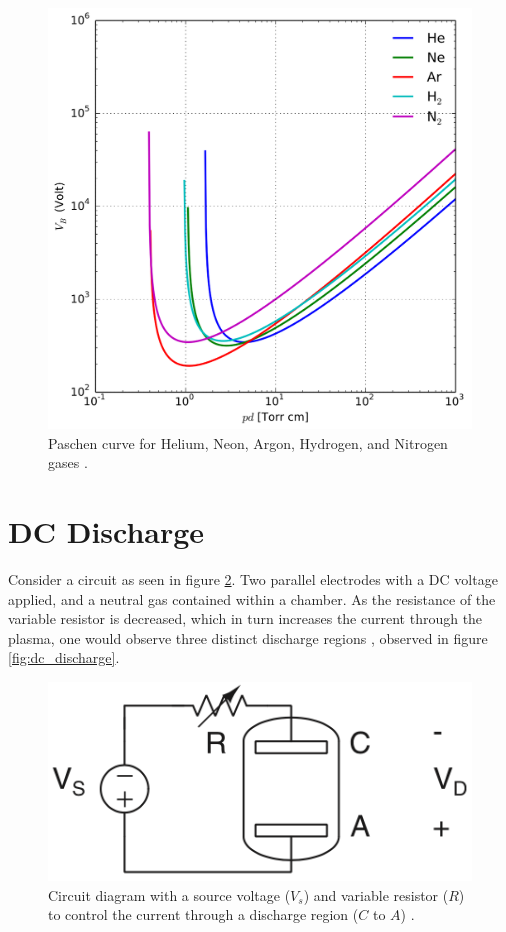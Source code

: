 \begin{figure}[h!]
	\centering
	\includegraphics[width=0.6\linewidth]{chapter_2/figures/paschen_curve.png}
	\caption{Paschen curve for Helium, Neon, Argon, Hydrogen, and Nitrogen gases \cite{Lieberman2005}.}
	\label{fig:pashen_curve}
\end{figure}

\section{DC Discharge}

Consider a circuit as seen in figure \ref{fig:basic_circuit}. Two parallel electrodes with a DC voltage applied, and a neutral gas contained within a chamber. As the resistance of the variable resistor is decreased, which in turn increases the current through the plasma, one would observe three distinct discharge regions \cite{Gudmundsson2017}, observed in figure \ref{fig:dc_discharge}.

\begin{figure}[h!]
	\centering
	\includegraphics[width=0.6\linewidth]{chapter_2/figures/basic_circuit.png}
	\caption{Circuit diagram with a source voltage ($V_s$) and variable resistor ($R$) to control the current through a discharge region ($C$ to $A$) \cite{Gudmundsson2017}.}
	\label{fig:basic_circuit}
\end{figure}

